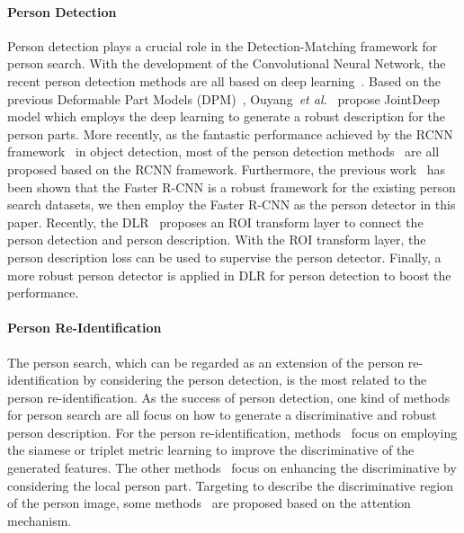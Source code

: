 \documentclass[journal]{IEEEtran}
\begin{document}
\paragraph{Person Detection}
Person detection plays a crucial role in the Detection-Matching framework for person search. With the development of the Convolutional Neural Network, the recent person detection methods are all based on deep learning~\cite{ZhangWBLL18,NohLKK18,SongSXSP18,LiLSXFY18,OuyangW13,ZhouY18,DBLP:journals/tmm/WangCLWZ18}. Based on the previous Deformable Part Models (DPM)~\cite{FelzenszwalbGMR10}, Ouyang~\emph{et al.}~\cite{OuyangW13} propose JointDeep model which employs the deep learning to generate a robust description for the person parts. More recently, as the fantastic performance achieved by the RCNN framework~\cite{GirshickDDM14,Girshick15,RenHG017} in object detection, most of the person detection methods~\cite{ZhangWBLL18,NohLKK18,SongSXSP18,LiLSXFY18,ZhouY18} are all proposed based on the RCNN framework.  
Furthermore, the previous work~\cite{LanZG18,ChenZOYT18} has been shown that the Faster R-CNN is a robust framework for the existing person search datasets, we then employ the Faster R-CNN as the person detector in this paper. 
Recently, the DLR~\cite{han2019re} proposes an ROI transform layer to connect the person detection and person description. With the ROI transform layer, the person description loss can be used to supervise the person detector. Finally, a more robust person detector is applied in DLR for person detection to boost the performance. 



\paragraph{Person Re-Identification} The person search, which can be regarded as an extension of the person re-identification by considering the person detection, is the most related to the person re-identification. As the success of person detection, one kind of methods~\cite{ChenZOYT18,LanZG18} for person search are all focus on how to generate a discriminative and robust person description. For the person re-identification, methods~\cite{YiLLL14,LiZXW14,AhmedJM15,VariorSLXW16,ChenZW16,DingLWC15,ChengGZWZ16,WangZLZZ16,WangYCLZ18,DBLP:journals/tmm/ZhouWSHGZ18} focus on employing the siamese or triplet metric learning to improve the discriminative of the generated features. The other methods~\cite{LiC0H17,SunZYTW18,WangYCLZ18,YaoZHZX019,ZhaoLZW17,ZhengHLY19,ZhaoTSSYYWT17,SuLZX0T17,DBLP:journals/tmm/WeiZY0019,ZhouWMLGZ19} focus on enhancing the discriminative by considering the local person part. Targeting to describe the discriminative region of the person image, some methods~\cite{LiuFQJY17,LiZG18,LiuZTSSYYW17} are proposed based on the attention mechanism.
\end{document}
